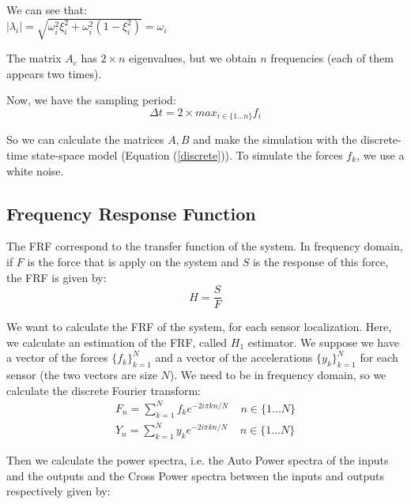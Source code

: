 \documentclass[journal]{IEEEtran}
\begin{document}
\begin{remark}
We can see that:\\
$|\lambda_i| = \sqrt{\omega_i^2 \xi_i^2 + \omega_i^2 (1 - \xi_i^2)} = \omega_i$
\end{remark}

\begin{remark}
The matrix $A_c$ has $2 \times n$ eigenvalues, but we obtain $n$ frequencies (each of them appears two times). 
\end{remark}

Now, we have the sampling period:
\begin{equation}
\Delta t = 2 \times max_{i \in \{1 ... n\} } f_i
\end{equation}

So we can calculate the matrices $A, B$ and make the simulation with the discrete-time state-space model (Equation (\ref{discrete})). To simulate the forces $f_k$, we use a white noise.

\subsection{Frequency Response Function}

The FRF correspond to the transfer function of the system. In frequency domain, if $F$ is the force that is apply on the system and $S$ is the response of this force, the FRF is given by:
\begin{equation}
H = \frac{S}{F}
\end{equation} 

We want to calculate the FRF of the system, for each sensor localization. Here, we calculate an estimation of the FRF, called $H_1$ estimator. We suppose we have a vector of the forces $\{ f_k\}_{k=1}^N$ and a vector of the accelerations $\{ y_k\}_{k=1}^N$ for each sensor (the two vectors are size $N$). We need to be in frequency domain, so we calculate the discrete Fourier transform:
\begin{equation}
\begin{array}{ll}
F_n = \sum\limits_{k=1}^N f_k e^{-2i\pi kn/N} \ \ \ \ \ n \in \{1 ... N\} \\
Y_n = \sum\limits_{k=1}^N y_k e^{-2i\pi kn/N} \ \ \ \ \ n \in \{1 ... N\}
\end{array}
\end{equation}

Then we calculate the power spectra, i.e. the Auto Power spectra of the inputs and the outputs
and the Cross Power spectra between the inputs and outputs respectively given by:
\end{document}
